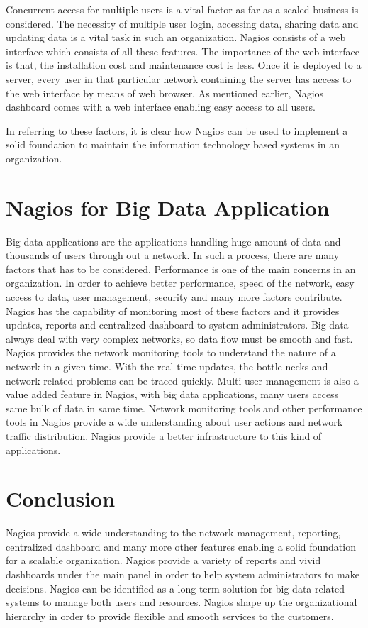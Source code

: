 \documentclass[9pt,twocolumn,twoside]{styles/osajnl}
\begin{document}
Concurrent access for multiple users is a vital factor as far as
a scaled business is considered. The necessity of multiple user login,
accessing data, sharing data and updating data is a vital task in such
an organization. Nagios consists of a web interface which consists of
all these features. The importance of the web interface is that,
the installation cost and maintenance cost is less. Once it is deployed
to a server, every user in that particular network containing the server
has access to the web interface by means of web browser. As mentioned earlier,
Nagios dashboard comes with a web interface enabling easy access to all users.

In referring to these factors, it is clear how Nagios can be used to
implement a solid foundation to maintain the information technology
based systems in an organization.

\section{Nagios for Big Data Application}

Big data applications are the applications handling huge amount of
data and thousands of users through out a network. In such a process,
there are many factors that has to be considered. Performance is
one of the main concerns in an organization. In order to achieve better
performance, speed of the network, easy access to data, user management,
security and many more factors contribute. Nagios has the capability of
monitoring most of these factors and it provides updates, reports and
centralized dashboard to system administrators. Big data always
deal with very complex networks, so data flow must be smooth and fast.
Nagios provides the network monitoring tools to understand the nature
of a network in a given time. With the real time updates, the bottle-necks
and network related problems can be traced quickly. Multi-user management
is also a value added feature in Nagios, with big data applications, many
users access same bulk of data in same time. Network monitoring tools and
other performance tools in Nagios provide a wide understanding about user
actions and network traffic distribution. Nagios provide a better infrastructure
to this kind of applications. 

\section{Conclusion}

Nagios provide a wide understanding to the network management, reporting,
centralized dashboard and many more other features enabling a solid
foundation for a scalable organization. Nagios provide a variety of
reports and vivid dashboards under the main panel in order to help
system administrators to make decisions. Nagios can be identified as a long
term solution for big data related systems to manage both users and resources.
Nagios shape up the organizational hierarchy in order to provide flexible
and smooth services to the customers.



 
\end{document}
